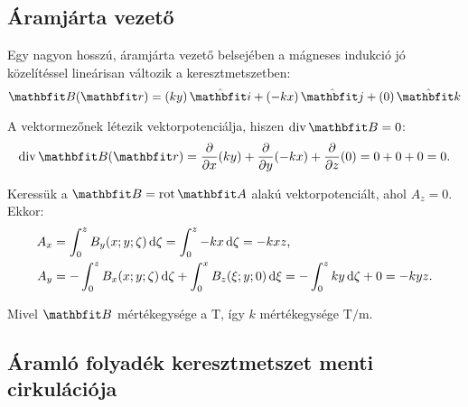 \documentclass{szb-practice}
\begin{document}
\subsection{Áramjárta vezető}

Egy nagyon hosszú, áramjárta vezető belsejében a mágneses indukció jó
közelítéssel lineárisan változik a keresztmetszetben:
$$
  \rvec B(\coordv) = \ijk{ky}{-kx}{0}
$$

A vektormezőnek létezik vektorpotenciálja, hiszen $\Div \rvec B = 0$:
$$
  \Div \rvec B(\coordv)
  = \pdv{}{x}(ky) + \pdv{}{y}(-kx) + \pdv{}{z}(0)
  = 0 + 0 + 0
  = 0
  \text.
$$

Keressük a $\rvec B = \rot \rvec A$ alakú vektorpotenciált, ahol $A_z = 0$.
Ekkor:
\begin{align*}
  A_x & = \int_0^z B_y(x; y; \zeta) \mathop{}\!\mathrm{d} \zeta = \int_0^z -kx \mathop{}\!\mathrm{d} \zeta = -kxz
  \text,                                                                         \\
  A_y & = -\int_0^z B_x(x; y; \zeta) \mathop{}\!\mathrm{d} \zeta + \int_0^x B_z(\xi; y; 0) \mathop{}\!\mathrm{d} \xi
  = -\int_0^z ky \mathop{}\!\mathrm{d} \zeta + 0 = -kyz
  \text.
\end{align*}

Mivel $\rvec B$ mértékegysége a $\si{\tesla}$, így $k$ mértékegysége
$\si{\tesla\per\meter}$.

\subsection{Áramló folyadék keresztmetszet menti cirkulációja}
\end{document}
